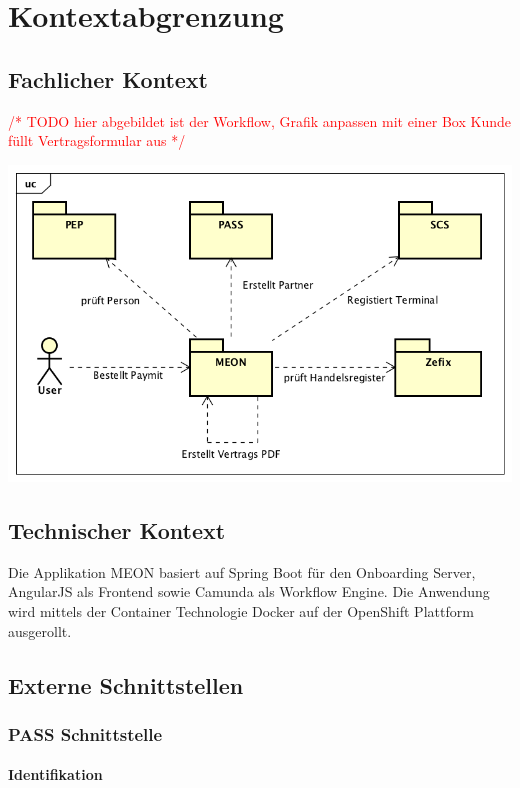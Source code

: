\graphicspath{{./images/}}

\chapter{Kontextabgrenzung}

\section{Fachlicher Kontext}
\textcolor{red}{/* TODO hier abgebildet ist der Workflow, Grafik anpassen mit einer Box Kunde füllt Vertragsformular aus */}
\begin{center}
	\includegraphics[scale=0.7]{kontext.png}
\end{center}


\section{Technischer Kontext}

Die Applikation MEON basiert auf Spring Boot für den Onboarding Server, AngularJS als Frontend sowie Camunda als Workflow Engine. Die Anwendung wird mittels der Container Technologie Docker auf der OpenShift Plattform ausgerollt. 

\section{Externe Schnittstellen}

\subsection{PASS Schnittstelle}
		
\subsubsection{Identifikation}

